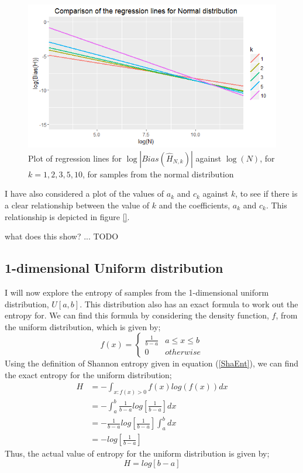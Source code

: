 \documentclass{article}
\begin{document}
\begin{figure}
  \begin{center}
    \includegraphics[width=\textwidth]{./Graphs/Normal_comparison.png}
  \end{center}
\caption{Plot of regression lines for $\log|Bias(\hat{H}_{N, k})|$ against $\log(N)$, for $k=1, 2, 3, 5, 10$, for samples from the normal distribution}
  \label{normal_comparison_graph}
\end{figure}

I have also considered a plot of the values of $a_{k}$ and $c_{k}$ against $k$, to see if there is a clear relationship between the value of $k$ and the coefficients,  $a_{k}$ and $c_{k}$. This relationship is depicted in figure \ref{}.

what does this show? ... TODO







\subsection{1-dimensional Uniform distribution} \label{Uniform_d=1}

I will now explore the entropy of samples from the 1-dimensional uniform distribution, $U[a, b]$. This distribution also has an exact formula to work out the entropy for. We can find this formula by considering the density function, $f$, from the uniform distribution, which is given by;
\[
f(x) =  \begin{cases} 
      \frac{1}{b-a} & a \leq x \leq b \\
      0 & otherwise
   \end{cases}
\]
Using the definition of Shannon entropy given in equation (\ref{ShaEnt}), we can find the exact entropy for the uniform distribution;
\begin{align*}
H &= - \int_{x : f(x) > 0} f(x) log(f(x)) dx \\ 
&= - \int_{a}^{b} \frac{1}{b-a} log \left[ \frac{1}{b-a} \right] dx  \\
&= - \frac{1}{b-a} log \left[ \frac{1}{b-a} \right]  \int_{a}^{b} dx  \\
&= -  log  \left[ \frac{1}{b-a} \right] 
\end{align*}
Thus, the actual value of entropy for the uniform distribution is given by;
\begin{equation} \label{UnifEnt}
H = log [ b-a ]
\end{equation}
\end{document}
